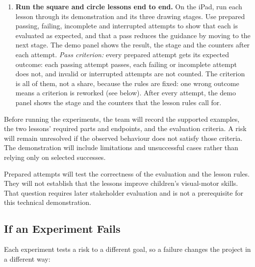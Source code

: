 \documentclass{article}
\begin{document}
\begin{enumerate}
    \item \textbf{Run the square and circle lessons end to end.}
    On the iPad, run each lesson through its demonstration and its three
    drawing stages. Use prepared passing, failing, incomplete and
    interrupted attempts to show that each is evaluated as expected, and
    that a pass reduces the guidance by moving to the next stage. The demo
    panel shows the result, the stage and the counters after each
    attempt.
    \emph{Pass criterion:} every prepared attempt gets its expected
    outcome: each passing attempt passes, each failing or incomplete attempt
    does not, and invalid or interrupted attempts are not counted. The
    criterion is all of them, not a share, because the rules are fixed: one
    wrong outcome means a criterion is reworked (see below). After every
    attempt, the demo panel shows the stage and the counters that the lesson
    rules call for.
\end{enumerate}

Before running the experiments, the team will record the supported
examples, the two lessons' required parts and endpoints, and the
evaluation criteria. A risk will remain unresolved if the observed behaviour
does not satisfy those criteria. The demonstration will include limitations
and unsuccessful cases rather than relying only on selected successes.

Prepared attempts will test the correctness of the evaluation and the lesson
rules. They will not establish that
the lessons improve children's visual-motor skills. That question requires
later stakeholder evaluation and is not a prerequisite for this technical
demonstration.

\subsection{If an Experiment Fails}

Each experiment tests a risk to a different goal, so a failure changes the
project in a different way:
\end{document}
